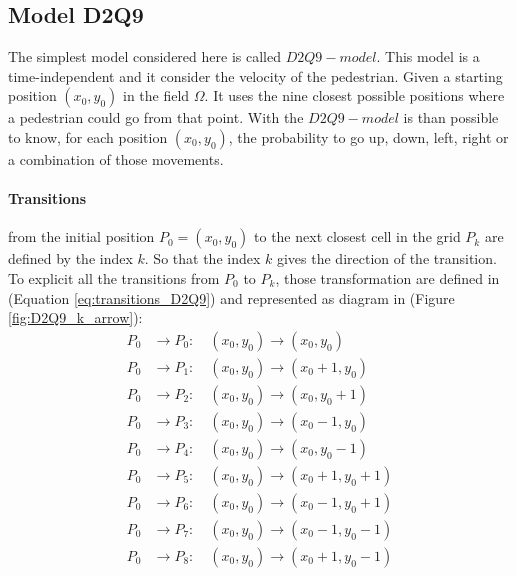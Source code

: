 \documentclass[class=article, crop=false]{standalone}
\begin{document}
\FloatBarrier
\subsection{Model D2Q9} \label{chap:Model_D2Q9}
The simplest model considered here is called $D2Q9-model$.
This model is a time-independent and it consider the velocity of the pedestrian.
Given a starting position $(x_0, y_0)$ in the field $\Omega$.
It uses the nine closest possible positions where a pedestrian could go from that point.
With the $D2Q9-model$ is than possible to know, for each position $(x_0, y_0)$, the probability to go up, down, left, right or a combination of those movements.
\paragraph{Transitions} from the initial position $P_0=(x_0, y_0)$ to the next closest cell in the grid $P_k$ are defined by the index $k$.
So that the index $k$ gives the direction of the transition.
To explicit all the transitions from $P_0$ to $P_k$, those transformation are defined in (Equation \ref{eq:transitions_D2Q9}) and represented as diagram in (Figure \ref{fig:D2Q9_k_arrow}):
\begin{equation}
\begin{split}
P_0 &\to P_0 : \quad (x_0, y_0) \to (x_0, y_0) \\
P_0 &\to P_1 : \quad (x_0, y_0) \to (x_0+1, y_0) \\
P_0 &\to P_2 : \quad (x_0, y_0) \to (x_0, y_0+1) \\
P_0 &\to P_3 : \quad (x_0, y_0) \to (x_0-1, y_0) \\
P_0 &\to P_4 : \quad (x_0, y_0) \to (x_0, y_0-1) \\
P_0 &\to P_5 : \quad (x_0, y_0) \to (x_0+1, y_0+1) \\
P_0 &\to P_6 : \quad (x_0, y_0) \to (x_0-1, y_0+1) \\
P_0 &\to P_7 : \quad (x_0, y_0) \to (x_0-1, y_0-1) \\
P_0 &\to P_8 : \quad (x_0, y_0) \to (x_0+1, y_0-1) \\
\end{split}
\label{eq:transitions_D2Q9}
\end{equation}
\end{document}
